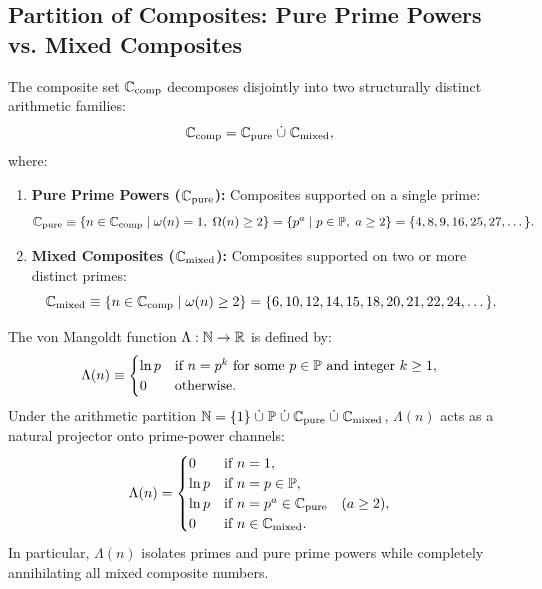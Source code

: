 \subsection{Partition of Composites: Pure Prime Powers vs. Mixed Composites}

\begin{definition}
\label{def:pure_mixed_composites}
\leanok
The composite set $\mathbb{C}_{\mathrm{comp}}$ decomposes disjointly into two structurally distinct arithmetic families:
\begin{equation}
\label{eq:composite_subpartition}
\mathbb{C}_{\mathrm{comp}} = \mathbb{C}_{\mathrm{pure}} \;\dot{\cup}\; \mathbb{C}_{\mathrm{mixed}},
\end{equation}
where:
\begin{enumerate}
  \item \textbf{Pure Prime Powers ($\mathbb{C}_{\mathrm{pure}}$):} Composites supported on a single prime:
  \begin{equation}
  \mathbb{C}_{\mathrm{pure}} \equiv \{n \in \mathbb{C}_{\mathrm{comp}} \mid \omega(n) = 1, \; \Omega(n) \ge 2\} = \{p^a \mid p \in \mathbb{P}, \; a \ge 2\} = \{4, 8, 9, 16, 25, 27, \dots\}.
  \end{equation}
  \item \textbf{Mixed Composites ($\mathbb{C}_{\mathrm{mixed}}$):} Composites supported on two or more distinct primes:
  \begin{equation}
  \mathbb{C}_{\mathrm{mixed}} \equiv \{n \in \mathbb{C}_{\mathrm{comp}} \mid \omega(n) \ge 2\} = \{6, 10, 12, 14, 15, 18, 20, 21, 22, 24, \dots\}.
  \end{equation}
\end{enumerate}
\end{definition}

\begin{proposition}
\label{prop:von_mangoldt}
\leanok
The von Mangoldt function $\Lambda: \mathbb{N} \to \mathbb{R}$ is defined by:
\begin{equation}
\label{eq:von_mangoldt_def}
\Lambda(n) \equiv \begin{cases}
\ln p & \text{if } n = p^k \text{ for some } p \in \mathbb{P} \text{ and integer } k \ge 1, \\
0 & \text{otherwise.}
\end{cases}
\end{equation}
Under the arithmetic partition $\mathbb{N} = \{1\} \;\dot{\cup}\; \mathbb{P} \;\dot{\cup}\; \mathbb{C}_{\mathrm{pure}} \;\dot{\cup}\; \mathbb{C}_{\mathrm{mixed}}$, $\Lambda(n)$ acts as a natural projector onto prime-power channels:
\begin{equation}
\Lambda(n) = \begin{cases}
0 & \text{if } n = 1, \\
\ln p & \text{if } n = p \in \mathbb{P}, \\
\ln p & \text{if } n = p^a \in \mathbb{C}_{\mathrm{pure}} \quad (a \ge 2), \\
0 & \text{if } n \in \mathbb{C}_{\mathrm{mixed}}.
\end{cases}
\end{equation}
In particular, $\Lambda(n)$ isolates primes and pure prime powers while completely annihilating all mixed composite numbers.
\end{proposition}

